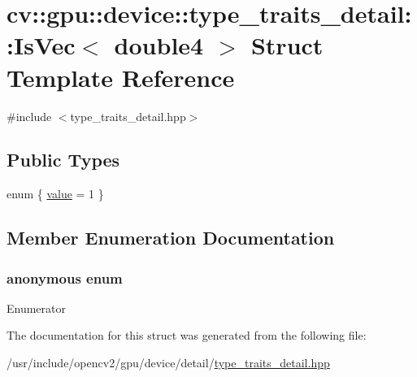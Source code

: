 \hypertarget{structcv_1_1gpu_1_1device_1_1type__traits__detail_1_1IsVec_3_01double4_01_4}{\section{cv\-:\-:gpu\-:\-:device\-:\-:type\-\_\-traits\-\_\-detail\-:\-:Is\-Vec$<$ double4 $>$ Struct Template Reference}
\label{structcv_1_1gpu_1_1device_1_1type__traits__detail_1_1IsVec_3_01double4_01_4}
}


{\ttfamily \#include $<$type\-\_\-traits\-\_\-detail.\-hpp$>$}

\subsection*{Public Types}
\begin{DoxyCompactItemize}
\item 
enum \{ \hyperlink{structcv_1_1gpu_1_1device_1_1type__traits__detail_1_1IsVec_3_01double4_01_4_ad5a5c2e1ae6f2b8715dba99490c9c5c5a33915206cdd600be01fb84fa26d0b43c}{value} = 1
 \}
\end{DoxyCompactItemize}


\subsection{Member Enumeration Documentation}
\hypertarget{structcv_1_1gpu_1_1device_1_1type__traits__detail_1_1IsVec_3_01double4_01_4_ad5a5c2e1ae6f2b8715dba99490c9c5c5}{\subsubsection[{anonymous enum}]{\setlength{\rightskip}{0pt plus 5cm}anonymous enum}}\label{structcv_1_1gpu_1_1device_1_1type__traits__detail_1_1IsVec_3_01double4_01_4_ad5a5c2e1ae6f2b8715dba99490c9c5c5}
\begin{Desc}
\item[Enumerator]\par
\begin{description}
\item[{\em 
\hypertarget{structcv_1_1gpu_1_1device_1_1type__traits__detail_1_1IsVec_3_01double4_01_4_ad5a5c2e1ae6f2b8715dba99490c9c5c5a33915206cdd600be01fb84fa26d0b43c}{value}\label{structcv_1_1gpu_1_1device_1_1type__traits__detail_1_1IsVec_3_01double4_01_4_ad5a5c2e1ae6f2b8715dba99490c9c5c5a33915206cdd600be01fb84fa26d0b43c}
}]\end{description}
\end{Desc}


The documentation for this struct was generated from the following file\-:\begin{DoxyCompactItemize}
\item 
/usr/include/opencv2/gpu/device/detail/\hyperlink{type__traits__detail_8hpp}{type\-\_\-traits\-\_\-detail.\-hpp}\end{DoxyCompactItemize}
